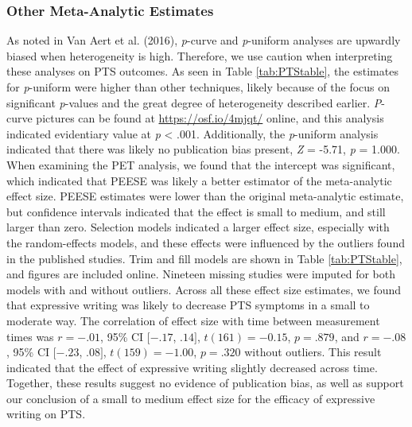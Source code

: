 \documentclass[man]{apa6}
\theoremstyle{definition}
\theoremstyle{definition}
\theoremstyle{definition}
\theoremstyle{remark}
\begin{document}
\subsubsection{Other Meta-Analytic
Estimates}\label{other-meta-analytic-estimates}

As noted in Van Aert et al. (2016), \emph{p}-curve and \emph{p}-uniform
analyses are upwardly biased when heterogeneity is high. Therefore, we
use caution when interpreting these analyses on PTS outcomes. As seen in
Table \ref{tab:PTStable}, the estimates for \emph{p}-uniform were higher
than other techniques, likely because of the focus on significant
\emph{p}-values and the great degree of heterogeneity described earlier.
\emph{P}-curve pictures can be found at \url{https://osf.io/4mjqt/}
online, and this analysis indicated evidentiary value at \emph{p}
\textless{} .001. Additionally, the \emph{p}-uniform analysis indicated
that there was likely no publication bias present, \emph{Z} = -5.71,
\emph{p} = 1.000. When examining the PET analysis, we found that the
intercept was significant, which indicated that PEESE was likely a
better estimator of the meta-analytic effect size. PEESE estimates were
lower than the original meta-analytic estimate, but confidence intervals
indicated that the effect is small to medium, and still larger than
zero. Selection models indicated a larger effect size, especially with
the random-effects models, and these effects were influenced by the
outliers found in the published studies. Trim and fill models are shown
in Table \ref{tab:PTStable}, and figures are included online. Nineteen
missing studies were imputed for both models with and without outliers.
Across all these effect size estimates, we found that expressive writing
was likely to decrease PTS symptoms in a small to moderate way. The
correlation of effect size with time between measurement times was
\(r = -.01\), 95\% CI \([-.17\), \(.14]\), \(t(161) = -0.15\),
\(p = .879\), and \(r = -.08\), 95\% CI \([-.23\), \(.08]\),
\(t(159) = -1.00\), \(p = .320\) without outliers. This result indicated
that the effect of expressive writing slightly decreased across time.
Together, these results suggest no evidence of publication bias, as well
as support our conclusion of a small to medium effect size for the
efficacy of expressive writing on PTS.
\end{document}
